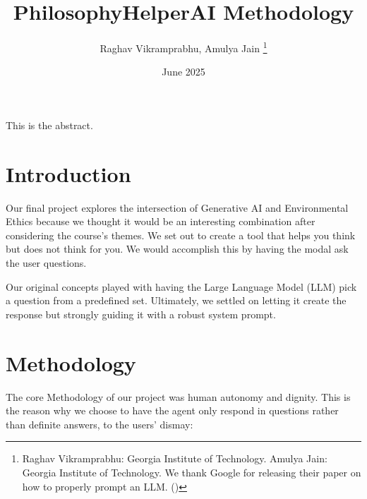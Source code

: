 \documentclass[letterpaper,11pt,leqno]{article}
\begin{document}
\title{PhilosophyHelperAI Methodology}

\author{Raghav Vikramprabhu, Amulya Jain
  \thanks{Raghav Vikramprabhu: Georgia Institute of Technology. Amulya Jain: Georgia Institute of Technology. We thank Google for releasing their paper on how to properly prompt an LLM. (\cite{PromptEngineering}) }}

\date{June 2025}


\begin{titlepage}
  \maketitle

  This is the abstract.

\end{titlepage}


\section{Introduction}\label{s:introduction}

Our final project explores the intersection of Generative AI and Environmental Ethics because we thought it would be an interesting combination after considering the course's themes. We set out to create a tool that helps you think but does not think for you. We would accomplish this by having the modal ask the user questions.

Our original concepts played with having the Large Language Model (LLM) pick a question from a predefined set. Ultimately, we settled on letting it create the response but strongly guiding it with a robust system prompt.

\section{Methodology}

The core Methodology of our project was human autonomy and dignity.
This is the reason why we choose to have the agent only respond in questions rather than definite answers, to the users' dismay:
\end{document}
